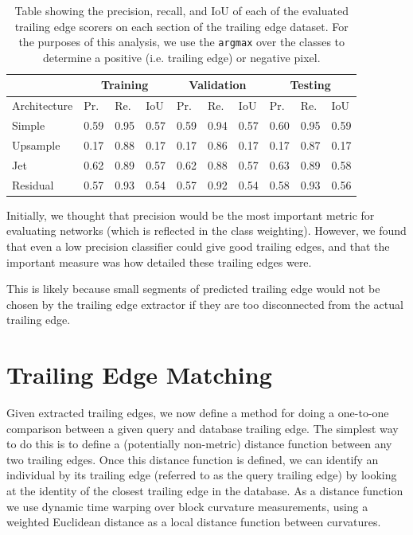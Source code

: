 \begin{table}[!htb]%
	\centering
	\resizebox{\linewidth}{!}
	{
		\begin{tabular} {l || l | l | l || l | l | l || l | l | l |}
		& \multicolumn{3}{c||}{Training} & \multicolumn{3}{c||}{Validation} & \multicolumn{3}{c|}{Testing} \\
		\hline
		Architecture & Pr. & Re. & IoU & Pr. & Re. & IoU & Pr. & Re. & IoU \\
		\hhline{=#===#===#===|}
		Simple & 0.59 & 0.95 & 0.57 & 0.59 & 0.94 & 0.57 & 0.60 & 0.95 & 0.59 \\
		\hline
		Upsample & 0.17 & 0.88 & 0.17 & 0.17 & 0.86 & 0.17 & 0.17 & 0.87 & 0.17 \\
		\hline
		Jet & 0.62 & 0.89 & 0.57 & 0.62 & 0.88 & 0.57 & 0.63 & 0.89 & 0.58 \\
		\hline
		Residual & 0.57 & 0.93 & 0.54 & 0.57 & 0.92 & 0.54 & 0.58 & 0.93 & 0.56 \\
		\hline
		\end{tabular}
	}
	\caption{Table showing the precision, recall, and IoU of each of the evaluated trailing edge scorers on each section of the trailing edge dataset. For the purposes of this analysis, we use the \texttt{argmax} over the classes to determine a positive (i.e. trailing edge) or negative pixel.}
	\label{tab:te_score_full_analysis}
\end{table}

Initially, we thought that precision would be the most important metric for evaluating networks (which is reflected in the class weighting).
However, we found that even a low precision classifier could give good trailing edges, and that the important measure was how detailed these trailing edges were.


This is likely because small segments of predicted trailing edge would not be chosen by the trailing edge extractor if they are too disconnected from the actual trailing edge.

\section{Trailing Edge Matching}

Given extracted trailing edges, we now define a method for doing a one-to-one comparison between a given query and database trailing edge.
The simplest way to do this is to define a (potentially non-metric) distance function between any two trailing edges.
Once this distance function is defined, we can identify an individual by its trailing edge (referred to as the query trailing edge) by looking at the identity of the closest trailing edge in the database.
As a distance function we use dynamic time warping over block curvature measurements, using a weighted Euclidean distance as a local distance function between curvatures.


